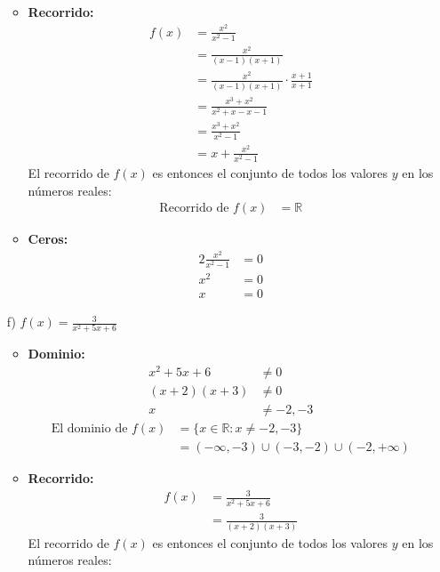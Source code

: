 \documentclass{templateNote}
\begin{document}
\begin{itemize}
\begin{itemize}
        \item \textbf{Recorrido:}
        \begin{align*}
            f(x) &= \frac{x^2}{x^2 - 1} \\
            &= \frac{x^2}{(x - 1)(x + 1)} \\
            &= \frac{x^2}{(x - 1)(x + 1)} \cdot \frac{x + 1}{x + 1} \\
            &= \frac{x^3 + x^2}{x^2 + x - x - 1} \\
            &= \frac{x^3 + x^2}{x^2 - 1} \\
            &= x + \frac{x^2}{x^2 - 1}
        \end{align*}
        El recorrido de \( f(x) \) es entonces el conjunto de todos los valores \( y \) en los números reales:
        \begin{align*}
            \text{Recorrido de } f(x) &= \mathbb{R}
        \end{align*}
        \item \textbf{Ceros:}
        \begin{alignat*}{2}
            \frac{x^2}{x^2 - 1} &= 0 \\
            x^2 &= 0 \\
            x &= 0
        \end{alignat*}
    \end{itemize}
    \item[f)] $f(x) = \frac{3}{x^2 + 5x + 6}$
    \begin{itemize}
        \item \textbf{Dominio:}
        \begin{align*}
            x^2 + 5x + 6 &\neq 0 \\
            (x + 2)(x + 3) &\neq 0 \\
            x &\neq -2, -3
        \end{align*}
        \begin{align*}
            \text{El dominio de } f(x) &= \{x \in \mathbb{R} : x \neq -2, -3\} \\
            &= (-\infty, -3) \cup (-3, -2) \cup (-2, +\infty)
        \end{align*}
        \item \textbf{Recorrido:}
        \begin{align*}
            f(x) &= \frac{3}{x^2 + 5x + 6} \\
            &= \frac{3}{(x + 2)(x + 3)}
        \end{align*}
        El recorrido de \( f(x) \) es entonces el conjunto de todos los valores \( y \) en los números reales:

\end{itemize}
\end{itemize}
\end{document}
